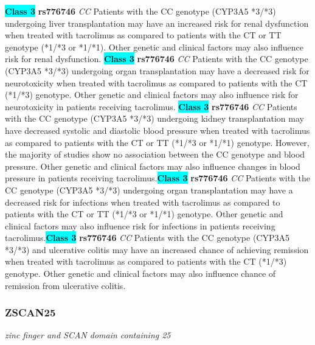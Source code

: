 \documentclass{report}
\begin{document}
\textbf{\colorbox{cyan} {Class 3}} \textbf{ rs776746 } \textit{ CC }
Patients with the CC genotype (CYP3A5 *3/*3) undergoing liver transplantation may have an increased risk for renal dysfunction when treated with tacrolimus as compared to patients with the CT or TT genotype (*1/*3 or *1/*1). Other genetic and clinical factors may also influence risk for renal dysfunction. \newline\textbf{\colorbox{cyan} {Class 3}} \textbf{ rs776746 } \textit{ CC }
Patients with the CC genotype (CYP3A5 *3/*3) undergoing organ transplantation may have a decreased risk for neurotoxicity when treated with tacrolimus as compared to patients with the CT (*1/*3) genotype. Other genetic and clinical factors may also influence risk for neurotoxicity in patients receiving tacrolimus. \newline\textbf{\colorbox{cyan} {Class 3}} \textbf{ rs776746 } \textit{ CC }
Patients with the CC genotype (CYP3A5 *3/*3) undergoing kidney transplantation may have decreased systolic and diastolic blood pressure when treated with tacrolimus as compared to patients with the CT or TT (*1/*3 or *1/*1) genotype. However, the majority of studies show no association between the CC genotype and blood pressure. Other genetic and clinical factors may also influence changes in blood pressure in patients receiving tacrolimus.\newline\textbf{\colorbox{cyan} {Class 3}} \textbf{ rs776746 } \textit{ CC }
Patients with the CC genotype (CYP3A5 *3/*3) undergoing organ transplantation may have a decreased risk for infections when treated with tacrolimus as compared to patients with the CT or TT (*1/*3 or *1/*1) genotype. Other genetic and clinical factors may also influence risk for infections in patients receiving tacrolimus.\newline\textbf{\colorbox{cyan} {Class 3}} \textbf{ rs776746 } \textit{ CC }
Patients with the CC genotype (CYP3A5 *3/*3) and ulcerative colitis may have an increased chance of achieving remission when treated with tacrolimus as compared to patients with the CT (*1/*3) genotype. Other genetic and clinical factors may also influence chance of remission from ulcerative colitis. \newline\subsubsection{ ZSCAN25 }
\textit{ zinc finger and SCAN domain containing 25 }
\end{document}
